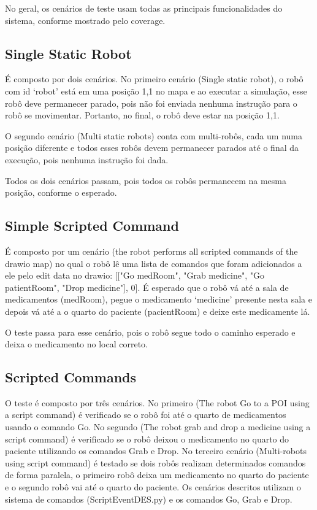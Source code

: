 No geral, os cenários de teste usam todas as principais funcionalidades do sistema, conforme mostrado pelo coverage.

\subsection{Single Static Robot}
\label{sec:singleStaticRobot}
É composto por dois cenários. No primeiro cenário (Single static robot), o robô com id ‘robot’ está em uma posição 1,1 no mapa e ao executar a simulação, esse robô deve permanecer parado, pois não foi enviada nenhuma instrução para o robô se movimentar. Portanto, no final, o robô deve estar na posição 1,1.

O segundo cenário (Multi static robots) conta com multi-robôs, cada um numa posição diferente e todos esses robôs devem permanecer parados até o final da execução, pois nenhuma instrução foi dada.

Todos os dois cenários passam, pois todos os robôs permanecem na mesma posição, conforme o esperado.

\subsection{Simple Scripted Command}
\label{sec:simpleScriptedCommand}
É composto por um cenário (the robot performs all scripted commands of the drawio map) no qual o robô lê uma lista de comandos que foram adicionados a ele pelo edit data no drawio: [["Go medRoom", "Grab medicine", "Go patientRoom", "Drop medicine"], 0]. É esperado que o robô vá até a sala de medicamentos (medRoom), pegue o medicamento ‘medicine’ presente nesta sala e depois vá até a o quarto do paciente (pacientRoom) e deixe este medicamente lá. 

O teste passa para esse cenário, pois o robô segue todo o caminho esperado e deixa o medicamento no local correto.

\subsection{Scripted Commands}
\label{sec:scriptedCommands}
O teste é composto por três cenários. No primeiro (The robot Go to a POI using a script command) é verificado se o robô foi até o quarto de medicamentos usando o comando Go. No segundo (The robot grab and drop a medicine using a script command) é verificado se o robô deixou o medicamento no quarto do paciente utilizando os comandos Grab e Drop. No terceiro cenário (Multi-robots using script command) é testado se dois robôs realizam determinados comandos de forma paralela, o primeiro robô deixa um medicamento no quarto do paciente e o segundo robô vai até o quarto do paciente. Os cenários descritos utilizam o sistema de comandos (ScriptEventDES.py) e os comandos Go, Grab e Drop.

